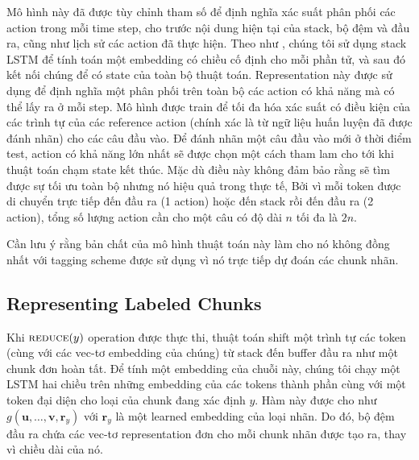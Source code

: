 \documentclass[11pt,letterpaper]{article}
\begin{document}
Mô hình này đã được tùy chỉnh tham số để định nghĩa xác suất phân phối các action trong mỗi time step, cho trước nội dung hiện tại của stack, bộ đệm và đầu ra, cũng như lịch sử các action đã thực hiện. Theo như , chúng tôi sử dụng stack LSTM để tính toán một embedding có chiều cố định cho mỗi phần tử, và sau đó kết nối chúng để có state của toàn bộ thuật toán. Representation này được sử dụng để định nghĩa một phân phối trên toàn bộ các action có khả năng mà có thể lấy ra ở mỗi step. Mô hình được train để tối đa hóa xác suất có điều kiện của các trình tự của các reference action (chính xác là từ ngữ liệu huấn luyện đã được đánh nhãn) cho các câu đầu vào. Để đánh nhãn một câu đầu vào mới ở thời điểm test, action có khả năng lớn nhất sẽ được chọn một cách tham lam cho tới khi thuật toán chạm state kết thúc. Mặc dù điều này không đảm bảo rằng sẽ tìm được sự tối ưu toàn bộ nhưng nó hiệu quả trong thực tế, Bởi vì mỗi token được di chuyển trực tiếp đến đầu ra (1 action) hoặc đến stack rồi đến đầu ra (2 action), tổng số lượng action cần cho một câu có độ dài $n$ tối đa là $2n$.

Cần lưu ý rằng bản chất của mô hình thuật toán này làm cho nó không đồng nhất với tagging scheme được sử dụng vì nó trực tiếp dự đoán các chunk nhãn.

\subsection{Representing Labeled Chunks}

Khi $\textsc{reduce}(y)$ operation được thực thi, thuật toán shift một trình tự các token (cùng với các vec-tơ embedding của chúng) từ stack đến buffer đầu ra như một chunk đơn hoàn tất. Để tính một embedding của chuỗi này, chúng tôi chạy một LSTM hai chiều trên những embedding của các tokens thành phần cùng với một token đại diện cho loại của chunk đang xác định $y$. Hàm này được cho như $g(\mathbf{u}, \ldots, \mathbf{v},\mathbf{r}_y)$ với $\mathbf{r}_y$ là một learned embedding của loại nhãn. Do đó, bộ đệm đầu ra chứa các vec-tơ representation đơn cho mỗi chunk nhãn được tạo ra, thay vì chiều dài của nó.
\end{document}

